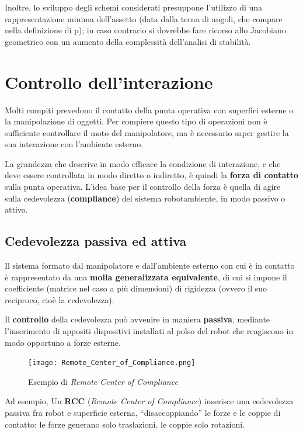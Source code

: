 Inoltre, lo sviluppo degli schemi considerati presuppone l’utilizzo di una rappresentazione minima dell’assetto (data dalla terna di angoli, che compare nella definizione di p); in caso contrario si dovrebbe fare ricorso allo Jacobiano geometrico con un aumento della complessità dell’analisi di stabilità.












\section{Controllo dell’interazione}
Molti compiti prevedono il contatto della punta operativa con superfici esterne o la manipolazione di oggetti. Per compiere questo tipo di operazioni non è sufficiente controllare il moto del manipolatore, ma è necessario saper gestire la sua interazione con l’ambiente esterno.

La grandezza che descrive in modo efficace la condizione di interazione, e che deve essere controllata in modo diretto o indiretto, è quindi la \textbf{forza di contatto} sulla punta operativa. L’idea base per il controllo della forza è quella di agire sulla cedevolezza (\textbf{compliance}) del sistema robotambiente, in modo passivo o attivo.


\subsection{Cedevolezza passiva ed attiva}

Il sistema formato dal manipolatore e dall’ambiente esterno con cui è in contatto è rappresentato da una \textbf{molla generalizzata equivalente}, di cui si impone il coefficiente (matrice nel caso a più dimensioni) di rigidezza (ovvero il suo reciproco, cioè la cedevolezza).

Il \textbf{controllo} della cedevolezza può avvenire in maniera \textbf{passiva}, mediante l’inserimento di appositi dispositivi installati al polso del robot che reagiscono in modo opportuno a forze esterne.

\begin{figure}[!ht]
	\centering
	\texttt{[image: Remote\_Center\_of\_Compliance.png]}
	\caption{Esempio di \textit{Remote Center of Compliance}}
	\label{fig:remotecenterofcompliance}
\end{figure}

Ad esempio, Un \textbf{RCC} (\textit{Remote Center of Compliance}) inserisce una cedevolezza passiva fra robot e superficie esterna, “disaccoppiando” le forze e le coppie di contatto: le forze generano solo traslazioni, le coppie solo rotazioni.

